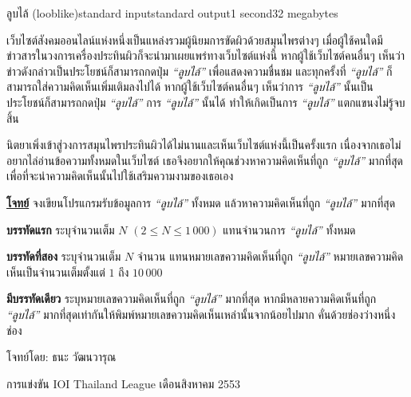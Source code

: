 \documentclass[11pt,a4paper]{article}
\begin{document}
\begin{problem}{ลูบไล้ (looblike)}{standard input}{standard output}{1 second}{32 megabytes}

เว็บไซต์สังคมออนไลน์แห่งหนึ่งเป็นแหล่งรวมผู้นิยมการขัดผิวด้วยสมุนไพรต่างๆ เมื่อผู้ใช้คนใดมีข่าวสารในวงการเครื่องประทินผิวก็จะนำมาเผยแพร่ทางเว็บไซต์แห่งนี้ หากผู้ใช้เว็บไซต์คนอื่นๆ เห็นว่าข่าวดังกล่าวเป็นประโยชน์ก็สามารถกดปุ่ม \textit{“ลูบไล้”} เพื่อแสดงความชื่นชม และทุกครั้งที่ \textit{“ลูบไล้”} ก็สามารถใส่ความคิดเห็นเพิ่มเติมลงไปได้ หากผู้ใช้เว็บไซต์คนอื่นๆ เห็นว่าการ \textit{“ลูบไล้”} นั้นเป็นประโยชน์ก็สามารถกดปุ่ม \textit{“ลูบไล้”} การ \textit{“ลูบไล้”} นั้นได้ ทำให้เกิดเป็นการ  \textit{“ลูบไล้”} แตกแขนงไม่รู้จบสิ้น

นิตยาเพิ่งเข้าสู่วงการสมุนไพรประทินผิวได้ไม่นานและเห็นเว็บไซต์แห่งนี้เป็นครั้งแรก เนื่องจากเธอไม่อยากไล่อ่านข้อความทั้งหมดในเว็บไซต์ เธอจึงอยากให้คุณช่วงหาความคิดเห็นที่ถูก \textit{“ลูบไล้”} มากที่สุด เพื่อที่จะนำความคิดเห็นนั้นไปใช้เสริมความงามของเธอเอง

\underline{\textbf{โจทย์}} จงเขียนโปรแกรมรับข้อมูลการ \textit{“ลูบไล้”} ทั้งหมด แล้วหาความคิดเห็นที่ถูก\textit{ “ลูบไล้”} มากที่สุด

\InputFile

\textbf{บรรทัดแรก} ระบุจำนวนเต็ม $N$ $(2 \leq N \leq 1\,000)$ แทนจำนวนการ \textit{“ลูบไล้”} ทั้งหมด

\textbf{บรรทัดที่สอง} ระบุจำนวนเต็ม $N$ จำนวน แทนหมายเลขความคิดเห็นที่ถูก \textit{“ลูบไล้”} หมายเลขความคิดเห็นเป็นจำนวนเต็มตั้งแต่ $1$ ถึง $10\,000$

\OutputFile

\textbf{มีบรรทัดเดียว} ระบุหมายเลขความคิดเห็นที่ถูก \textit{“ลูบไล้”} มากที่สุด หากมีหลายความคิดเห็นที่ถูก \textit{“ลูบไล้”} มากที่สุดเท่ากันให้พิมพ์หมายเลขความคิดเห็นเหล่านั้นจากน้อยไปมาก คั่นด้วยช่องว่างหนึ่งช่อง

\Examples

\begin{example}
%
%
\end{example}

\newpage
\Source

โจทย์โดย: ธนะ วัฒนวารุณ

การแข่งขัน IOI Thailand League เดือนสิงหาคม 2553

\end{problem}
\end{document}
